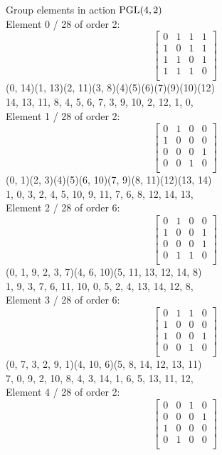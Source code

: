 Group elements in action ${\rm PGL}(4,2)$\\
Element     0 / 28 of order 2:
$$
\left[
\begin{array}{*{4}{r}}
0 & 1 & 1 & 1\\
1 & 0 & 1 & 1\\
1 & 1 & 0 & 1\\
1 & 1 & 1 & 0\\
\end{array}
\right]
$$
(0, 14)(1, 13)(2, 11)(3, 8)(4)(5)(6)(7)(9)(10)(12)\\
14, 13, 11, 8, 4, 5, 6, 7, 3, 9, 10, 2, 12, 1, 0, \\
Element     1 / 28 of order 2:
$$
\left[
\begin{array}{*{4}{r}}
0 & 1 & 0 & 0\\
1 & 0 & 0 & 0\\
0 & 0 & 0 & 1\\
0 & 0 & 1 & 0\\
\end{array}
\right]
$$
(0, 1)(2, 3)(4)(5)(6, 10)(7, 9)(8, 11)(12)(13, 14)\\
1, 0, 3, 2, 4, 5, 10, 9, 11, 7, 6, 8, 12, 14, 13, \\
Element     2 / 28 of order 6:
$$
\left[
\begin{array}{*{4}{r}}
0 & 1 & 0 & 0\\
1 & 0 & 0 & 1\\
0 & 0 & 0 & 1\\
0 & 1 & 1 & 0\\
\end{array}
\right]
$$
(0, 1, 9, 2, 3, 7)(4, 6, 10)(5, 11, 13, 12, 14, 8)\\
1, 9, 3, 7, 6, 11, 10, 0, 5, 2, 4, 13, 14, 12, 8, \\
Element     3 / 28 of order 6:
$$
\left[
\begin{array}{*{4}{r}}
0 & 1 & 1 & 0\\
1 & 0 & 0 & 0\\
1 & 0 & 0 & 1\\
0 & 0 & 1 & 0\\
\end{array}
\right]
$$
(0, 7, 3, 2, 9, 1)(4, 10, 6)(5, 8, 14, 12, 13, 11)\\
7, 0, 9, 2, 10, 8, 4, 3, 14, 1, 6, 5, 13, 11, 12, \\
Element     4 / 28 of order 2:
$$
\left[
\begin{array}{*{4}{r}}
0 & 0 & 1 & 0\\
0 & 0 & 0 & 1\\
1 & 0 & 0 & 0\\
0 & 1 & 0 & 0\\
\end{array}
\right]
$$

